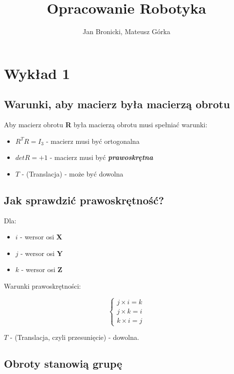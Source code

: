 \documentclass{article}
\title{Opracowanie Robotyka}
\author{Jan Bronicki, Mateusz Górka}
\date{}
\begin{document}
\maketitle

\tableofcontents
\newpage
\section{Wykład 1}


\subsection{Warunki, aby macierz była macierzą obrotu}

Aby macierz obrotu {\bf R} była macierzą obrotu musi spełniać warunki:

\begin{itemize}
    \item $R^{T}R=I_{3}$ - macierz musi być ortogonalna
    \item $det R=+1$ - macierz musi być {\bf \it prawoskrętna}
    \item $T$ - (Translacja) - może być dowolna
\end{itemize}

\subsection{Jak sprawdzić prawoskrętność?}

Dla:

\begin{itemize}
    \item $i$ - wersor osi {\bf X}
    \item $j$ - wersor osi {\bf Y}
    \item $k$ - wersor osi {\bf Z}
\end{itemize}

Warunki prawoskrętności:

\Large
$$
    \left\{
    \begin{array}{l}
        j \times i = k \\
        j \times k = i \\
        k \times i = j
    \end{array}
    \right.
$$
\normalsize

{\bf $T$} - (Translacja, czyli przesunięcie) - dowolna.

\subsection{Obroty stanowią grupę}
\end{document}
